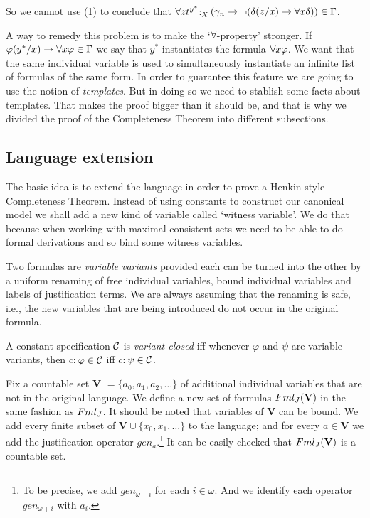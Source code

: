 \qquad  So  we cannot use (1) to conclude that $\forall z t^{y^{*}}$$:_{X}$$(\gamma_{n} \rightarrow \neg (\delta(z/ x) \rightarrow \forall x \delta)) \in \Gamma$.


\qquad  A way to remedy this problem is to make the `$\forall$-property' stronger. If  $\varphi(y^{*}/ x) \rightarrow \forall x \varphi \in \Gamma$ we say that $y^{*}$ instantiates the formula $\forall x \varphi$. We want that the same individual variable is used to simultaneously instantiate an infinite list of formulas of the same form. In order to guarantee this feature we are going to use the notion of \textit{templates}. But in doing so we need to stablish some facts about templates. That makes the proof bigger than it should be, and that is why we divided the proof of the Completeness Theorem into different subsections.  




\subsection{Language extension}

\qquad The basic idea is to extend the language in order to prove a Henkin-style Completeness Theorem. Instead of using constants to construct our canonical model we shall add a new kind of variable called `witness variable'. We do that because when working with maximal consistent sets we need to be able to do formal derivations and so bind some witness variables.



\begin{defn}
	Two formulas are \textit{variable variants} provided each can be turned into the other by a uniform renaming of free individual variables, bound individual variables and labels of justification terms. We are always assuming that the renaming is safe, i.e., the new variables that are being introduced do not occur in the original formula.
\end{defn}

\begin{defn}
	A constant specification $\mathcal{C}$ is \textit{variant closed} iff whenever $\varphi$ and $\psi$ are variable variants, then $c$$:$$\varphi \in \mathcal{C}$ iff $c$$:$$\psi \in \mathcal{C}$.
\end{defn}


\begin{defn}
	Fix a countable set \textbf{V} $=\{a_{0}, a_{1}, a_{2}, \dots \}$ of additional individual variables that are not in the original language. We define a new set of formulas $Fml_{J}(\textbf{V})$ in the same fashion as $Fml_{J}$. It should be noted that variables of \textbf{V} can be bound. We add every finite subset of $\textbf{V}\cup \{x_{0}, x_{1}, \dots \}$ to the language; and for every $a \in \textbf{V}$ we add the justification operator $gen_{a}$.\footnote{To be precise, we add $gen_{\omega +i}$ for each $i \in \omega$. And we identify each operator $gen_{\omega +i}$ with $a_{i}$.} It can be easily checked that $Fml_{J}(\textbf{V})$ is a countable set.
	
\end{defn}


